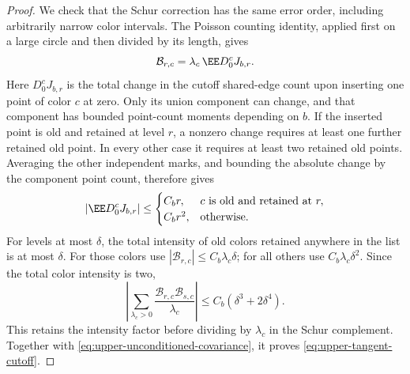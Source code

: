 \documentclass[11pt,letterpaper]{article}
\begin{document}
\begin{proof}
We check that the Schur correction has the same error order,
including arbitrarily narrow color intervals.
The Poisson counting identity, applied first on a large
circle and then divided by its length, gives
\[
 \mathcal B_{r,c}
       =\lambda_c\,\EE D_0^cJ_{b,r}.
\]
Here $D_0^cJ_{b,r}$ is the total change in the cutoff
shared-edge count upon inserting one point of color $c$
at zero. Only its union component can change, and that
component has bounded point-count moments depending on $b$.
If the inserted point is old and retained at level $r$,
a nonzero change requires at least one further retained
old point. In every other case it requires at least two
retained old points. Averaging the other independent marks,
and bounding the absolute change by the component point count,
therefore gives
\[
 |\EE D_0^cJ_{b,r}|\le
 \begin{cases}
 C_br,&c\text{ is old and retained at }r,\\
 C_br^2,&\text{otherwise}.
 \end{cases}
\]
For levels at most $\delta$, the total intensity of old
colors retained anywhere in the list is at most $\delta$.
For those colors use
$|\mathcal B_{r,c}|\le C_b\lambda_c\delta$;
for all others use $C_b\lambda_c\delta^2$.
Since the total color intensity is two,
\[
 \left|\sum_{\lambda_c>0}
        \frac{\mathcal B_{r,c}\mathcal B_{s,c}}{\lambda_c}\right|
                    \le C_b(\delta^3+2\delta^4).
\]
This retains the intensity factor before dividing by
$\lambda_c$ in the Schur complement.
Together with \eqref{eq:upper-unconditioned-covariance},
it proves \eqref{eq:upper-tangent-cutoff}.
\end{proof}
\end{document}
